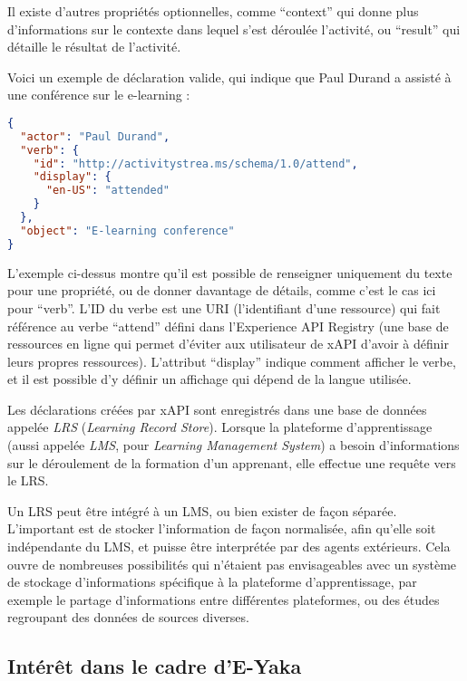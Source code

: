             Il existe d’autres propriétés optionnelles, comme \enquote{context} qui donne plus d’informations sur le contexte dans lequel s’est déroulée l’activité, ou \enquote{result} qui détaille le résultat de l’activité.

            Voici un exemple de déclaration valide, qui indique que Paul Durand a assisté à une conférence sur le e-learning :

\begin{lstlisting}[language=json, numbers=none]
{
  "actor": "Paul Durand",
  "verb": {
    "id": "http://activitystrea.ms/schema/1.0/attend",
    "display": { 
      "en-US": "attended" 
    }
  },
  "object": "E-learning conference"
}
\end{lstlisting}

            L’exemple ci-dessus montre qu’il est possible de renseigner uniquement du texte pour une propriété, ou de donner davantage de détails, comme c’est le cas ici pour \enquote{verb}. L’ID du verbe est une URI (l’identifiant d’une ressource) qui fait référence au verbe \enquote{attend} défini dans l’Experience API Registry (une base de ressources en ligne qui permet d’éviter aux utilisateur de xAPI d’avoir à définir leurs propres ressources). L’attribut \enquote{display} indique comment afficher le verbe, et il est possible d’y définir un affichage qui dépend de la langue utilisée.

            Les déclarations créées par xAPI sont enregistrés dans une base de données appelée \emph{LRS} (\emph{Learning Record Store}). Lorsque la plateforme d’apprentissage (aussi appelée \emph{LMS}, pour \emph{Learning Management System}) a besoin d’informations sur le déroulement de la formation d’un apprenant, elle effectue une requête vers le LRS.

            Un LRS peut être intégré à un LMS, ou bien exister de façon séparée. L’important est de stocker l’information de façon normalisée, afin qu’elle soit indépendante du LMS, et puisse être interprétée par des agents extérieurs. Cela ouvre de nombreuses possibilités qui n’étaient pas envisageables avec un système de stockage d’informations spécifique à la plateforme d’apprentissage, par exemple le partage d’informations entre différentes plateformes, ou des études regroupant des données de sources diverses.

        \subsection{Intérêt dans le cadre d’E-Yaka}

